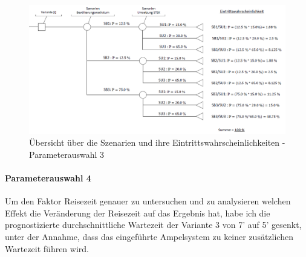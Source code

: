 \begin{figure}[h!]
	\centering
	\includegraphics[width=\textwidth]{figures/f-04-09-02-Entscheidungsbaum-Szenarien-Zustand-3}
	\caption[Szenarienübersicht - Parameterauswahl 3]{Übersicht über die Szenarien und ihre Eintrittswahrscheinlichkeiten - Parameterauswahl 3}
	\label{img:EntscheidunSzenarien-Z3}
\end{figure}

\paragraph{Parameterauswahl 4} Um den Faktor Reisezeit genauer zu untersuchen und zu analysieren welchen Effekt die Veränderung der Reisezeit auf das Ergebnis hat, habe ich die prognostizierte durchschnittliche Wartezeit der Variante 3 von 7' auf 5' gesenkt, unter der Annahme, dass das eingeführte Ampelsystem zu keiner zusätzlichen Wartezeit führen wird.



%

